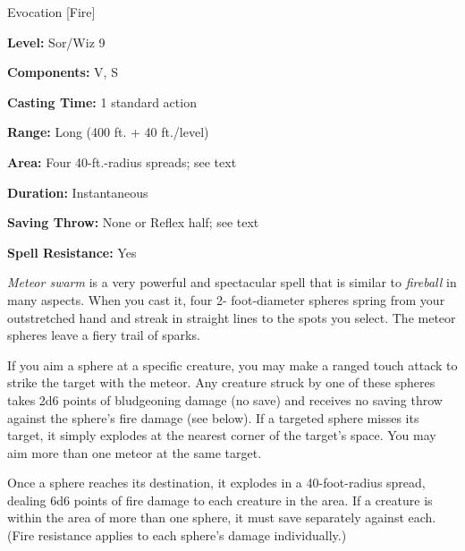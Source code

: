
Evocation [Fire]

\textbf{Level:} Sor/Wiz 9

\textbf{Components:} V, S

\textbf{Casting Time:} 1 standard action

\textbf{Range:} Long (400 ft. + 40 ft./level)

\textbf{Area:} Four 40-ft.-radius spreads; see text

\textbf{Duration:} Instantaneous

\textbf{Saving Throw:} None or Reflex half; see text

\textbf{Spell Resistance:} Yes

\textit{Meteor swarm} is a very powerful and spectacular spell that is similar 
to \textit{fireball} in many aspects. When you cast it, four 2- foot-diameter spheres 
spring from your outstretched hand and streak in straight lines to the spots you 
select. The meteor spheres leave a fiery trail of sparks.

If you aim a sphere at a specific creature, you may make a ranged touch attack 
to strike the target with the meteor. Any creature struck by one of these spheres 
takes 2d6 points of bludgeoning damage (no save) and receives no saving throw against 
the sphere's fire damage (see below). If a targeted sphere misses its target, it 
simply explodes at the nearest corner of the target's space. You may aim more than 
one meteor at the same target.

Once a sphere reaches its destination, it explodes in a 40-foot-radius spread, 
dealing 6d6 points of fire damage to each creature in the area. If a creature is 
within the area of more than one sphere, it must save separately against each. 
(Fire resistance applies to each sphere's damage individually.)


